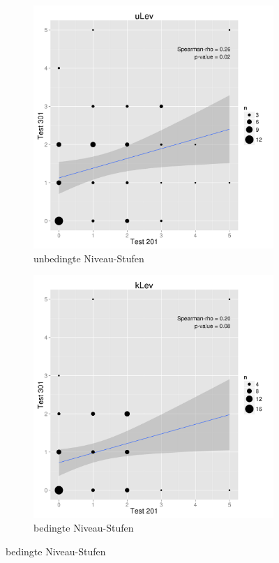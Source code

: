 \begin{figure}[bhtp]
\centering
\begin{subfigure}{0.49\textwidth}
  \includegraphics[width=1.0\linewidth]{graphics/cor201301u.png}
  \caption{unbedingte Niveau-Stufen}
  \label{fig:cor201301k}
\end{subfigure}
\begin{subfigure}{0.49\textwidth}
  \includegraphics[width=1.0\linewidth]{graphics/cor201301k.png}
  \caption{bedingte Niveau-Stufen}
  \label{fig:cor201301u}
\end{subfigure}
\end{figure}
